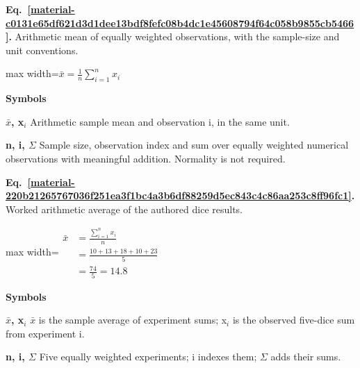 \documentclass[11pt,a4paper]{article}
\begin{document}
\par\medskip
\begin{samepage}
\label{material-c0131e65df621d3d1dee13bdf8fefc08b4dc1e45608794f64c058b9855cb5466}
\noindent\textbf{Eq.~\ref*{material-c0131e65df621d3d1dee13bdf8fefc08b4dc1e45608794f64c058b9855cb5466}.} Arithmetic mean of equally weighted observations, with the sample-size and unit conventions.\par\nopagebreak
\begin{center}\begin{adjustbox}{max width=\linewidth}$\displaystyle \bar{x} = \frac{1}{n} \sum_{i=1}^{n} x_i$\end{adjustbox}\end{center}

\par\noindent\textbf{Symbols}

\par\noindent\textbf{\ensuremath{\bar{x}}, x\ensuremath{{}_i}} Arithmetic sample mean and observation i, in the same unit.

\par\noindent\textbf{n, i, \ensuremath{\Sigma}} Sample size, observation index and sum over equally weighted numerical observations with meaningful addition. Normality is not required.

\end{samepage}
\medskip

\par\medskip
\begin{samepage}
\label{material-220b21265767036f251ea3f1bc4a3b6df88259d5ec843c4c86aa253c8ff96fc1}
\noindent\textbf{Eq.~\ref*{material-220b21265767036f251ea3f1bc4a3b6df88259d5ec843c4c86aa253c8ff96fc1}.} Worked arithmetic average of the authored dice results.\par\nopagebreak
\begin{center}\begin{adjustbox}{max width=\linewidth}$\displaystyle \begin{aligned}\bar{x}&=\frac{\sum_{i=1}^{n}x_i}{n}\\&=\frac{10+13+18+10+23}{5}\\&=\frac{74}{5}=14.8\end{aligned}$\end{adjustbox}\end{center}

\par\noindent\textbf{Symbols}

\par\noindent\textbf{\ensuremath{\bar{x}}, x\ensuremath{{}_i}} \ensuremath{\bar{x}} is the sample average of experiment sums; x\ensuremath{{}_i} is the observed five-dice sum from experiment i.

\par\noindent\textbf{n, i, \ensuremath{\Sigma}} Five equally weighted experiments; i indexes them; \ensuremath{\Sigma} adds their sums.

\end{samepage}
\medskip
\end{document}
